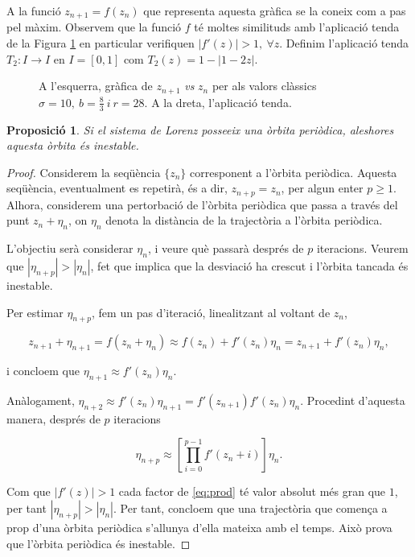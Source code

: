 \documentclass[11pt,a4paper,openright,oneside]{article}
\numberwithin{equation}{section}
\newtheorem{prop}[teo]{Proposici\'o}
\theoremstyle{definition}
\begin{document}
A la funció $z_{n+1}=f\left(z_n\right)$ que representa aquesta gràfica se la coneix com a pas pel màxim. Observem que la funció $f$ té moltes similituds amb l'aplicació tenda de la Figura \ref{fig:tent} en particular verifiquen $|f'\left(z\right)|>1, \ \forall z$. Definim l'aplicació tenda $T_2:I\rightarrow{I}$ en $I=[0,1]$ com $T_2\left(z\right)=1-|1-2z|$.

\begin{figure}[htbp]
    \centering
    \qquad
    \caption{A l'esquerra, gràfica de $z_{n+1}$ \textit{vs} $z_n$ per als valors clàssics $\sigma=10, \ b=\frac{8}{3} \ i \ r=28$. A la dreta, l'aplicació tenda.}
    \label{fig:tent}
\end{figure} 

\begin{prop}
    Si el sistema de Lorenz posseeix una òrbita periòdica, aleshores aquesta òrbita és inestable.
\end{prop}

\begin{proof}
    Considerem la seqüència $\{z_n\}$ corresponent a l'òrbita periòdica. Aquesta seqüència, eventualment es repetirà, és a dir, $z_{n+p}=z_n$, per algun enter $p\geq 1$. Alhora, considerem una pertorbació de l'òrbita periòdica que passa a través del punt $z_n+\eta_n$, on $\eta_n$ denota la distància de la trajectòria a l'òrbita periòdica.

    L'objectiu serà considerar $\eta_n$, i veure què passarà després de $p$ iteracions. Veurem que $|\eta_{n+p}|>|\eta_n|$, fet que implica que la desviació ha crescut i l'òrbita tancada és inestable.

    Per estimar $\eta_{n+p}$, fem un pas d'iteració, linealitzant al voltant de $z_n$,

    \begin{equation*}
        z_{n+1}+\eta_{n+1}=f\left(z_n+\eta_n\right)\approx f\left(z_n\right)+f'\left(z_n\right)\eta_n=z_{n+1}+f'\left(z_n\right)\eta_n,
    \end{equation*}

    i concloem que $\eta_{n+1}\approx f'\left(z_n\right)\eta_n$.

    Anàlogament, $\eta_{n+2}\approx f'\left(z_n\right)\eta_{n+1}=f'\left(z_{n+1}\right)f'\left(z_n\right)\eta_n$. Procedint d'aquesta manera, després de $p$ iteracions 

    \begin{equation} \label{eq:prod}
        \eta_{n+p}\approx \left[\prod_{i=0}^{p-1}f'\left(z_n+i\right) \right]\eta_n.
    \end{equation}

    Com que $|f'(z)|>1$ cada factor de \eqref{eq:prod} té valor absolut més gran que $1$, per tant $|\eta_{n+p}|>|\eta_n|$. Per tant, concloem que una trajectòria que comença a prop d'una òrbita periòdica s'allunya d'ella mateixa amb el temps. Això prova que l'òrbita periòdica és inestable.
\end{proof}
\end{document}
